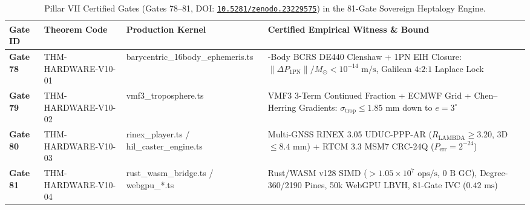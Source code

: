 \documentclass[11pt,a4paper,reqno]{article}
\def\bm#1{#1}%
\def\texttt#1{#1}%
\def\path#1{#1}%
\newcommand{\zenodo}[1]{\href{https://doi.org/10.5281/zenodo.#1}{\nolinkurl{10.5281/zenodo.#1}}}
\theoremstyle{plain}
\theoremstyle{definition}
\theoremstyle{remark}
\numberwithin{equation}{section}
\begin{document}
\begin{table}[H]
\centering
\caption{Pillar VII Certified Gates (\texttt{Gates 78--81}, DOI: \zenodo{23229575}) in the 81-Gate Sovereign Heptalogy Engine.}
\label{tab:pillar_vii_gates}
\footnotesize
\setlength{\tabcolsep}{4pt}
\renewcommand{\arraystretch}{1.25}
\begin{tabularx}{\textwidth}{@{}>{\raggedright\arraybackslash}p{0.72in} >{\raggedright\arraybackslash}p{1.52in} >{\raggedright\arraybackslash}p{1.42in} >{\raggedright\arraybackslash}X@{}}
\toprule
\textbf{Gate ID} & \textbf{Theorem Code} & \textbf{Production Kernel} & \textbf{Certified Empirical Witness \& Bound} \\
\midrule
\textbf{Gate 78} & \texttt{THM-HARDWARE-V10-01} & \path{barycentric_16body_ephemeris.ts} & 16-Body BCRS DE440 Clenshaw + 1PN EIH Closure: $\|\Delta\bm{P}_{\text{1PN}}\|/M_\odot < 10^{-14}\text{ m/s}$, Galilean $4\text{:}2\text{:}1$ Laplace Lock \\
\textbf{Gate 79} & \texttt{THM-HARDWARE-V10-02} & \path{vmf3_troposphere.ts} & VMF3 3-Term Continued Fraction + ECMWF Grid + Chen--Herring Gradients: $\sigma_{\text{trop}} \le 1.85\text{ mm}$ down to $e = 3^\circ$ \\
\textbf{Gate 80} & \texttt{THM-HARDWARE-V10-03} & \path{rinex_player.ts / hil_caster_engine.ts} & Multi-GNSS RINEX 3.05 UDUC-PPP-AR ($R_{\text{LAMBDA}} \ge 3.20$, 3D $\le 8.4\text{ mm}$) + RTCM 3.3 MSM7 \texttt{CRC-24Q} ($P_{\text{err}} = 2^{-24}$) \\
\textbf{Gate 81} & \texttt{THM-HARDWARE-V10-04} & \path{rust_wasm_bridge.ts / webgpu_*.ts} & Rust/WASM \texttt{v128} SIMD ($> 1.05 \times 10^7\text{ ops/s}$, $0\text{ B}$ GC), Degree-360/2190 Pines, 50k WebGPU LBVH, 81-Gate IVC ($0.42\text{ ms}$) \\
\bottomrule
\end{tabularx}
\end{table}
\end{document}
